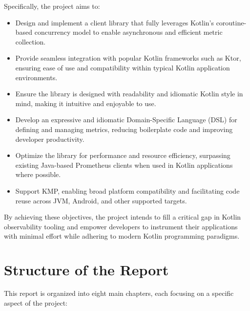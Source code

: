 Specifically, the project aims to:

\begin{itemize}
    \item Design and implement a client library that fully leverages Kotlin’s coroutine-based concurrency model to enable asynchronous and efficient metric collection.
    \item Provide seamless integration with popular Kotlin frameworks such as Ktor, ensuring ease of use and compatibility within typical Kotlin application environments.
    \item Ensure the library is designed with readability and idiomatic Kotlin style in mind, making it intuitive and enjoyable to use.
    \item Develop an expressive and idiomatic Domain-Specific Language (DSL) for defining and managing metrics, reducing boilerplate code and improving developer productivity.
    \item Optimize the library for performance and resource efficiency, surpassing existing Java-based Prometheus
    clients when used in Kotlin applications where possible.
    \item Support \ac{KMP}, enabling broad platform compatibility and facilitating code reuse across JVM, Android, and
    other supported targets.
\end{itemize}

By achieving these objectives, the project intends to fill a critical gap in Kotlin observability tooling and empower developers to instrument their applications with minimal effort while adhering to modern Kotlin programming paradigms.

\section{Structure of the Report}\label{sec:structure-of-the-report}

This report is organized into eight main chapters, each focusing on a specific aspect of the project:

